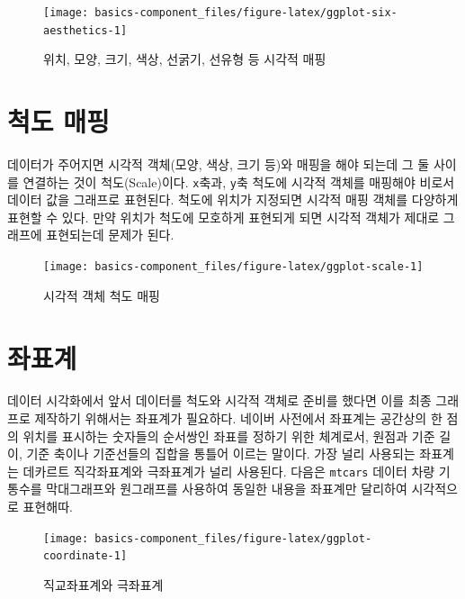 \documentclass[
]{book}
\begin{document}
\begin{figure}

{\centering \texttt{[image: basics-component\_files/figure-latex/ggplot-six-aesthetics-1]} 

}

\caption{위치, 모양, 크기, 색상, 선굵기, 선유형 등 시각적 매핑}\label{fig:ggplot-six-aesthetics}
\end{figure}

\hypertarget{scale-mapping}{%
\section{척도 매핑}\label{scale-mapping}}

데이터가 주어지면 시각적 객체(모양, 색상, 크기 등)와 매핑을 해야 되는데 그 둘 사이를 연결하는 것이 척도(Scale)이다.
\texttt{x}축과, \texttt{y}축 척도에 시각적 객체를 매핑해야 비로서 데이터 값을 그래프로 표현된다.
척도에 위치가 지정되면 시각적 매핑 객체를 다양하게 표현할 수 있다. 만약 위치가 척도에 모호하게 표현되게 되면
시각적 객체가 제대로 그래프에 표현되는데 문제가 된다.

\begin{figure}

{\centering \texttt{[image: basics-component\_files/figure-latex/ggplot-scale-1]} 

}

\caption{시각적 객체 척도 매핑}\label{fig:ggplot-scale}
\end{figure}

\hypertarget{coordinate}{%
\section{좌표계}\label{coordinate}}

데이터 시각화에서 앞서 데이터를 척도와 시각적 객체로 준비를 했다면 이를 최종 그래프로 제작하기 위해서는 좌표계가 필요하다.
네이버 사전에서 좌표계는 공간상의 한 점의 위치를 표시하는 숫자들의 순서쌍인 좌표를 정하기 위한 체계로서, 원점과 기준 길이, 기준 축이나 기준선들의 집합을 통틀어 이르는 말이다. 가장 널리 사용되는 좌표계는 데카르트 직각좌표계와 극좌표계가 널리 사용된다.
다음은 \texttt{mtcars} 데이터 차량 기통수를 막대그래프와 원그래프를 사용하여 동일한 내용을 좌표계만 달리하여 시각적으로 표현해따.

\begin{figure}

{\centering \texttt{[image: basics-component\_files/figure-latex/ggplot-coordinate-1]} 

}

\caption{직교좌표계와 극좌표계}\label{fig:ggplot-coordinate}
\end{figure}
\end{document}

